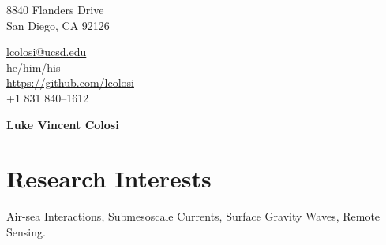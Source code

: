 \documentclass[10pt]{article}
\begin{document}
\pagestyle{empty}
\begin{minipage}[ht]{0.48\textwidth}
\begin{flushleft}
\small{8840 Flanders Drive} \\
\small{San Diego, CA 92126} \\
\end{flushleft}
\end{minipage}
\hfill
\begin{minipage}[ht]{0.48\textwidth}
\begin{flushright}
\noindent \href{mailto:lcolosi@ucsd.edu}{lcolosi@ucsd.edu} \ \ \ \ \ \ \ \ \ \ \ \ \ \ \ \ \ \ \ \   \\
\noindent he/him/his \ \ \ \ \ \ \ \ \ \ \ \ \ \ \ \ \ \ \ \ \ \ \ \ \ \ \  \\
{\url{https://github.com/lcolosi} }\\
\small{+1 831 840--1612} \ \ \ \ \ \ \ \ \ \ \ \ \ \ \ \ \  \ \ \ \ \ \ \     \\
\end{flushright}
\end{minipage}


\vspace{.5cm}
\begin{center}
	{\bfseries\Huge Luke Vincent Colosi}
\end{center}
\vspace{.5cm}

\section*{Research Interests}
\vspace{.3cm}
\hspace{1cm}Air-sea Interactions, Submesoscale Currents, Surface Gravity Waves, Remote Sensing.

\end{document}
